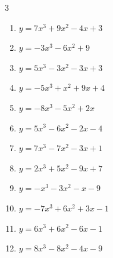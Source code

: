 \begin{multicols}{3}
\begin{enumerate}

  \item $y=7x^{3}+9x^{2}-4x+3$


  \item $y=-3x^{3}-6x^{2}+9$


  \item $y=5x^{3}-3x^{2}-3x+3$


  \item $y=-5x^{3}+x^{2}+9x+4$


  \item $y=-8x^{3}-5x^{2}+2x$


  \item $y=5x^{3}-6x^{2}-2x-4$


  \item $y=7x^{3}-7x^{2}-3x+1$


  \item $y=2x^{3}+5x^{2}-9x+7$


  \item $y=-x^{3}-3x^{2}-x-9$


  \item $y=-7x^{3}+6x^{2}+3x-1$


  \item $y=6x^{3}+6x^{2}-6x-1$


  \item $y=8x^{3}-8x^{2}-4x-9$



\end{enumerate}
\end{multicols}

